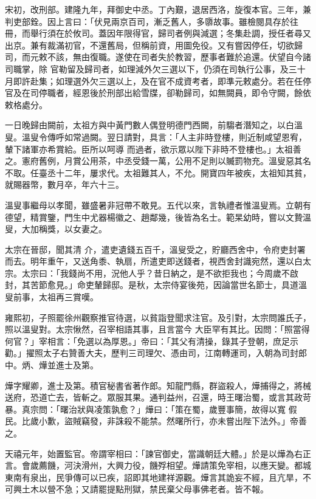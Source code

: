 \begin{pinyinscope}
 宋初，改刑部。建隆九年，拜御史中丞。丁內艱，退居西洛，旋復本官。三年，兼判吏部銓。因上言曰：「伏見兩京百司，漸乏舊人，多隳故事。雖檢閱具存於往冊，而舉行須在於攸司。蓋因年限得官，歸司者例與減選；冬集赴調，授任者尋又出京。兼有裁滿初官，不還舊局，但稱前資，用圖免役。又有嘗因停任，切欲歸司，而元敕不該，無由復職。遂使在司者失於教習，歷事者難於追還。伏望自今諸司職掌，除
 官勒留及歸司者，如理減外欠三選以下，仍須在司執行公事，及三十月即許赴集；如理選外欠三選以上，及在官不成資考者，即準元敕處分。若在任停官及在司停職者，經恩後於刑部出給雪牒，卻勒歸司，如無闕員，即令守闕，餘依敕格處分。



 一日晚歸由闕前，太祖方與中黃門數人偶登明德門西闕，前騶者潛知之，以白溫叟。溫叟令傳呼如常過闕。翌日請對，具言：「人主非時登樓，則近制咸望恩宥，輦下諸軍亦希賞給。臣所以呵導
 而過者，欲示眾以陛下非時不登樓也。」太祖善之。憲府舊例，月賞公用茶，中丞受錢一萬，公用不足則以贓罰物充。溫叟惡其名不取。任臺丞十二年，屢求代。太祖難其人，不允。開寶四年被疾，太祖知其貧，就賜器幣，數月卒，年六十三。



 溫叟事繼母以孝聞，雖盛暑非冠帶不敢見。五代以來，言執禮者惟溫叟焉。立朝有德望，精賞鑒，門生中尤器楊徽之、趙鄰幾，後皆為名士。範杲幼時，嘗以文贄溫叟，大加稱獎，以女妻之。



 太宗在晉邸，聞其清
 介，遣吏遺錢五百千，溫叟受之，貯廳西舍中，令府吏封署而去。明年重午，又送角黍、執扇，所遣吏即送錢者，視西舍封識宛然，還以白太宗。太宗曰：「我錢尚不用，況他人乎？昔日納之，是不欲拒我也；今周歲不啟封，其苦節愈見。」命吏輦歸邸。是秋，太宗侍宴後苑，因論當世名節士，具道溫叟前事，太祖再三賞嘆。



 雍熙初，子照罷徐州觀察推官待選，以貧詣登聞求注官。及引對，太宗問誰氏子，照以溫叟對。太宗愀然，召宰相語其事，且言當今
 大臣罕有其比。因問：「照當得何官？」宰相言：「免選以為厚恩。」帝曰：「其父有清操，錄其子登朝，庶足示勸。」擢照太子右贊善大夫，歷判三司理欠、憑由司，江南轉運司，入朝為司封郎中。炳、燁並進士及第。



 燁字耀卿，進士及第。積官秘書省著作郎。知龍門縣，群盜殺人，燁捕得之，將械送府，恐道亡去，皆斬之。眾服其果。通判益州，召還，時王曙治蜀，或言其政苛暴。真宗問：「曙治狀與凌策孰愈？」燁曰：「策在蜀，歲豐事簡，故得以寬
 假民。比歲小歉，盜賊竊發，非誅殺不能禁。然曙所行，亦未嘗出陛下法外。」帝善之。



 天禧元年，始置監官。帝謂宰相曰：「諫官御史，當識朝廷大體。」於是以燁為右正言。會歲薦饑，河決滑州，大興力役，饑殍相望。燁請策免宰相，以應天變。都城東南有泉出，民爭傳可以已疾，詔即其地建祥源觀。燁言其詭妄不經，且亢旱，不可興土木以營不急；又請罷提點刑獄，禁民棄父母事佛老者。皆不報。




\end{pinyinscope}
